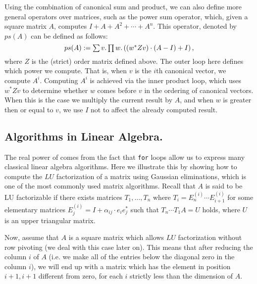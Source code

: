 Using the combination of canonical sum and product, we can also define more general operators over matrices, such as the power sum operator, which, given a square matrix $A$, computes $I + A + A^2 + \cdots + A^n$. This operator, denoted by $ps(A)$ can be defined as follows:
$$ps(A) := \textstyle\sum v.\textstyle\prod w. \left( (w^*Zv)\cdot (A-I) + I\right),$$
where $Z$ is the (strict) order matrix defined above. The outer loop here defines which power we compute. That is, when $v$ is the $i$th canonical vector, we compute $A^i$. Computing $A^i$ is achieved via the inner product loop, which uses $w^*Zv$ to determine whether $w$ comes before $v$ in the ordering of canonical vectors. When this is the case we multiply the current result by $A$, and when $w$ is greater then or equal to $v$, we use $I$ not to affect the already computed result.


\subsection{Algorithms in Linear Algebra.} The real power of \langfor comes from the fact that \texttt{for} loops allow us to express many classical linear algebra algorithms. Here we illustrate this by showing how to compute the $LU$ factorization of a matrix using Gaussian eliminations, which is one of the most commonly used matrix algorithms. Recall that $A$ is said to be LU factorizable if there exists matrices $T_1,\ldots, T_{n}$ where $T_i=E_{n}^{(i)}\cdots E_{i+1}^{(i)}$ for some elementary matrices $E_{j}^{(i)}=I+\alpha_{ij}\cdot e_{i}e_{j}^{*}$ such that $T_{n}\cdots T_1A=U$ holds, where $U$ is an upper triangular matrix.

Now, assume that $A$ is a square matrix which allows $LU$ factorization without row pivoting (we deal with this case later on). This means that after reducing the column $i$ of $A$ (i.e. we make all of the entries below the diagonal zero in the column $i$), we will end up with a matrix which has the element in position $i+1,i+1$ different from zero, for each $i$ strictly less than the dimension of $A$. 

